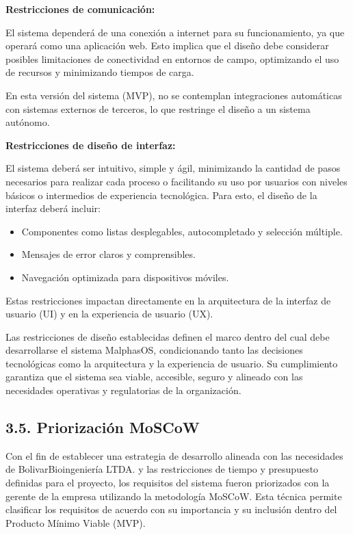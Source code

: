 \documentclass[12pt,a4paper]{article}
\newcommand{\subsectiontitle}[1]{%
  \subsection*{#1}
  \addcontentsline{toc}{subsection}{#1}
}
\begin{document}
\textbf{Restricciones de comunicación:}

El sistema dependerá de una conexión a internet para su funcionamiento, ya que operará como una aplicación web. Esto implica que el diseño debe considerar posibles limitaciones de conectividad en entornos de campo, optimizando el uso de recursos y minimizando tiempos de carga.

En esta versión del sistema (MVP), no se contemplan integraciones automáticas con sistemas externos de terceros, lo que restringe el diseño a un sistema autónomo.

\textbf{Restricciones de diseño de interfaz:}

El sistema deberá ser intuitivo, simple y ágil, minimizando la cantidad de pasos necesarios para realizar cada proceso o facilitando su uso por usuarios con niveles básicos o intermedios de experiencia tecnológica. Para esto, el diseño de la interfaz deberá incluir:

\begin{itemize}
  \item Componentes como listas desplegables, autocompletado y selección múltiple.

  \item Mensajes de error claros y comprensibles.

  \item Navegación optimizada para dispositivos móviles.
\end{itemize}

Estas restricciones impactan directamente en la arquitectura de la interfaz de usuario (UI) y en la experiencia de usuario (UX).

Las restricciones de diseño establecidas definen el marco dentro del cual debe desarrollarse el sistema MalphasOS, condicionando tanto las decisiones tecnológicas como la arquitectura y la experiencia de usuario. Su cumplimiento garantiza que el sistema sea viable, accesible, seguro y alineado con las necesidades operativas y regulatorias de la organización.

\subsectiontitle{3.5. Priorización MoSCoW}

Con el fin de establecer una estrategia de desarrollo alineada con las necesidades de BolivarBioingeniería LTDA. y las restricciones de tiempo y presupuesto definidas para el proyecto, los requisitos del sistema fueron priorizados con la gerente de la empresa utilizando la metodología MoSCoW. Esta técnica permite clasificar los requisitos de acuerdo con su importancia y su inclusión dentro del Producto Mínimo Viable (MVP).
\end{document}
